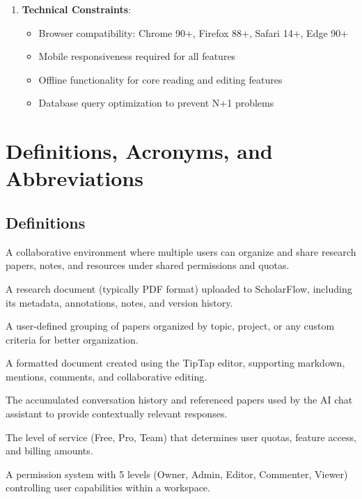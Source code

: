 \begin{enumerate}
    \item \textbf{Technical Constraints}:
          \begin{itemize}
              \item Browser compatibility: Chrome 90+, Firefox 88+, Safari 14+, Edge 90+
              \item Mobile responsiveness required for all features
              \item Offline functionality for core reading and editing features
              \item Database query optimization to prevent N+1 problems
          \end{itemize}
\end{enumerate}

\section{Definitions, Acronyms, and Abbreviations}

\subsection{Definitions}

\begin{description}[leftmargin=3cm, style=nextline]
    \item[\textbf{Workspace}] A collaborative environment where multiple users can organize and share research papers, notes, and resources under shared permissions and quotas.

    \item[\textbf{Paper}] A research document (typically PDF format) uploaded to ScholarFlow, including its metadata, annotations, notes, and version history.

    \item[\textbf{Collection}] A user-defined grouping of papers organized by topic, project, or any custom criteria for better organization.

    \item[\textbf{Rich Text Note}] A formatted document created using the TipTap editor, supporting markdown, mentions, comments, and collaborative editing.

    \item[\textbf{AI Context}] The accumulated conversation history and referenced papers used by the AI chat assistant to provide contextually relevant responses.

    \item[\textbf{Subscription Tier}] The level of service (Free, Pro, Team) that determines user quotas, feature access, and billing amounts.

    \item[\textbf{Role-Based Access}] A permission system with 5 levels (Owner, Admin, Editor, Commenter, Viewer) controlling user capabilities within a workspace.
\end{description}

